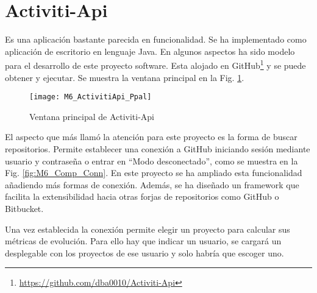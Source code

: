 
\section{Activiti-Api}

Es una aplicación bastante parecida en funcionalidad. Se ha implementado como aplicación de escritorio en lenguaje Java. En algunos aspectos ha sido modelo para el desarrollo de este proyecto software. Esta alojado en GitHub\footnote{\url{https://github.com/dba0010/Activiti-Api}} y se puede obtener y ejecutar. Se muestra la ventana principal en la Fig. \ref{fig:M6_ActivitiApi_Ppal}.

\begin{figure}[h!]
	\centering
	\texttt{[image: M6\_ActivitiApi\_Ppal]}
	\caption{Ventana principal de Activiti-Api}\label{fig:M6_ActivitiApi_Ppal}
\end{figure}

El aspecto que más llamó la atención para este proyecto es la forma de buscar repositorios. Permite establecer una conexión a GitHub iniciando sesión mediante usuario y contraseña o entrar en ``Modo desconectado'', como se muestra en la Fig. \ref{fig:M6_Comp_Conn}. En este proyecto se ha ampliado esta funcionalidad añadiendo más formas de conexión. Además, se ha diseñado un framework que facilita la extensibilidad hacia otras forjas de repositorios como GitHub o Bitbucket.


Una vez establecida la conexión permite elegir un proyecto para calcular sus métricas de evolución. Para ello hay que indicar un usuario, se cargará un desplegable con los proyectos de ese usuario y solo habría que escoger uno.


